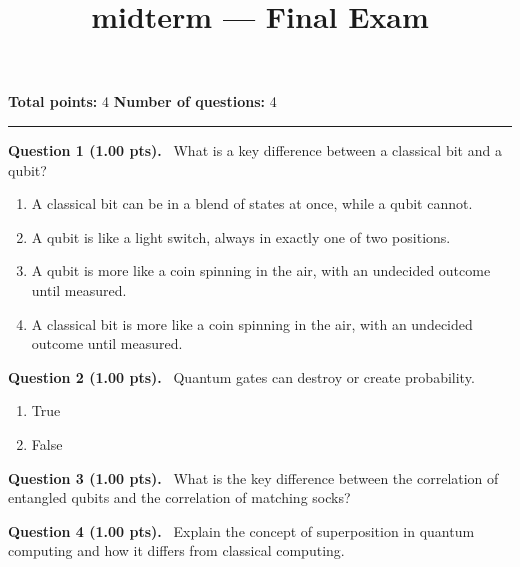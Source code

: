 \documentclass[12pt,a4paper]{article}
\title{midterm --- Final Exam}
\date{}
\begin{document}
\maketitle



\noindent
\textbf{Total points:} 4
\hfill
\textbf{Number of questions:} 4

\vspace{1em}
\hrule
\vspace{1.5em}


\noindent
\textbf{Question 1 (1.00 pts).}~
What is a key difference between a classical bit and a qubit?


\begin{enumerate}[label=\textbf{\Alph*.}]

  \item A classical bit can be in a blend of states at once, while a qubit cannot.

  \item A qubit is like a light switch, always in exactly one of two positions.

  \item A qubit is more like a coin spinning in the air, with an undecided outcome until measured.

  \item A classical bit is more like a coin spinning in the air, with an undecided outcome until measured.

\end{enumerate}



\vspace{0.5em}


\noindent
\textbf{Question 2 (1.00 pts).}~
Quantum gates can destroy or create probability.


\begin{enumerate}[label=\textbf{\Alph*.}]
  \item True
  \item False
\end{enumerate}



\vspace{0.5em}


\noindent
\textbf{Question 3 (1.00 pts).}~
What is the key difference between the correlation of entangled qubits and the correlation of matching socks?


\vspace{0.4cm}
\noindent\makebox[\linewidth]{\hrulefill}
\vspace{0.6cm}



\vspace{0.5em}


\noindent
\textbf{Question 4 (1.00 pts).}~
Explain the concept of superposition in quantum computing and how it differs from classical computing.


\vspace{0.4cm}
\noindent\makebox[\linewidth]{\hrulefill}
\vspace{0.4cm}
\noindent\makebox[\linewidth]{\hrulefill}
\vspace{0.4cm}
\noindent\makebox[\linewidth]{\hrulefill}
\vspace{0.6cm}
\end{document}

